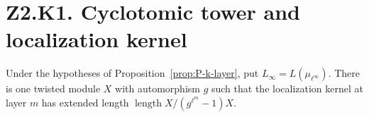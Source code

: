 \section*{Z2.K1. Cyclotomic tower and localization kernel}

\begin{lemma}\label{lem:P-r3-k1}
Under the hypotheses of Proposition~\ref{prop:P-k-layer}, put
$L_\infty=L(\mu_{\ell^\infty})$. There is one twisted module $X$ with
automorphism $g$ such that the localization kernel at layer $m$ has
extended length $\operatorname{length} X/(g^{\ell^m}-1)X$.
\end{lemma}
